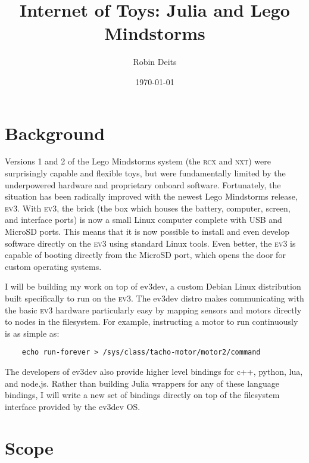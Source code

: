 \documentclass[]{article}
\author{Robin Deits}
\date{\today}
\title{Internet of Toys: Julia and Lego Mindstorms}
\newcommand{\ev}{\textsc{ev3}}
\begin{document}
\maketitle


\section{Background}
Versions 1 and 2 of the Lego Mindstorms system (the \textsc{rcx} and \textsc{nxt}) were surprisingly capable and flexible toys, but were fundamentally limited by the underpowered hardware and proprietary onboard software. Fortunately, the situation has been radically improved with the newest Lego Mindstorms release, \textsc{ev3}. With \textsc{ev3}, the brick (the box which houses the battery, computer, screen, and interface ports) is now a small Linux computer complete with USB and MicroSD ports. This means that it is now possible to install and even develop software directly on the \textsc{ev3} using standard Linux tools. Even better, the \ev{} is capable of booting directly from the MicroSD port, which opens the door for custom operating systems. 

I will be building my work on top of ev3dev, a custom Debian Linux distribution built specifically to run on the \ev{}. The ev3dev distro makes communicating with the basic \ev{} hardware particularly easy by mapping sensors and motors directly to nodes in the filesystem. For example, instructing a motor to run continuously is as simple as:

\begin{verbatim}
    echo run-forever > /sys/class/tacho-motor/motor2/command
\end{verbatim}
The developers of ev3dev also provide higher level bindings for c++, python, lua, and node.js. Rather than building Julia wrappers for any of these language bindings, I will write a new set of bindings directly on top of the filesystem interface provided by the ev3dev OS. 

\section{Scope}
\end{document}
